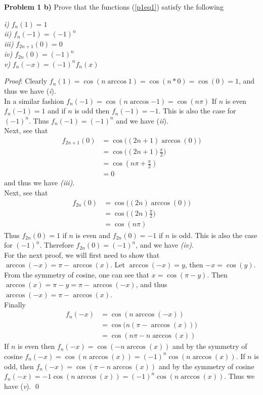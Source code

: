 \documentclass[12pt]{article}
\newcommand{\problem}[1]{\hspace{-4 ex} \large \textbf{Problem #1} }
\renewenvironment{proof}{\hspace{-4 ex} \emph{Proof}:}{\qed}
\begin{document}
\problem{1 b)} Prove that the functions (\ref{p1eq1}) satisfy the following
	
	\emph{i)} $f_n(1) = 1$ \\
	\emph{ii)} $f_n(-1) = (-1)^n$ \\
	\emph{iii)} $f_{2n+1}(0) = 0$ \\
	\emph{iv)} $f_{2n}(0) = (-1)^n$ \\
	\emph{v)} $f_n(-x) = (-1)^nf_n(x)$
	
	\doublespacing
	\begin{proof}
		Clearly $f_n(1) = \cos{(n \arccos{1})} = \cos{(n*0)} = \cos{(0)} = 1$, and thus we have (\emph{i}). \\
		In a similar fashion $f_n(-1) = \cos{(n \arccos{-1})} = \cos(n\pi)$ If $n$ is even $f_n(-1) = 1$ and if $n$ is odd then $f_n(-1)=-1$. This is also the case for $(-1)^n$. Thus $f_n(-1) = (-1)^n$ and we have (\emph{ii}). \\
		Next, see that
		\begin{align*}
			f_{2n+1}(0) & = \cos \big( (2n+1) \arccos(0) \big) \\
			& = \cos \big( (2n+1) \tfrac{\pi}{2} \big) \\
			& = \cos(n\pi + \tfrac{\pi}{2}) \\
			& = 0
		\end{align*}
		and thus we have \emph{(iii)}.\\
		Next, see that
		\begin{align*}
			f_{2n}(0) & = \cos \big( (2n) \arccos(0) \big) \\
			& = \cos \big( (2n) \tfrac{\pi}{2} \big) \\
			& = \cos(n\pi)
		\end{align*}
		Thus $f_{2n}(0)=1$ if $n$ is even and $f_{2n}(0)=-1$ if $n$ is odd. This is also the case for $(-1)^n$. Therefore $f_{2n}(0) = (-1)^n$, and we have \emph{(iv)}.\\
		For the next proof, we will first need to show that $\arccos(-x) = \pi - \arccos(x)$. Let $\arccos(-x)=y$, then $-x = \cos(y)$. From the symmetry of cosine, one can see that $x = \cos(\pi-y)$. Then $\arccos(x) = \pi - y = \pi - \arccos(-x)$, and thus $\arccos(-x) = \pi - \arccos(x)$.\\
		Finally 
		\begin{align*}
			f_n(-x) & = \cos(n \arccos(-x)) \\
			& = \cos \big( n (\pi - \arccos(x)) \big) \\
			& = \cos (n\pi - n\arccos(x))
		\end{align*}
		If $n$ is even then $f_n(-x) = \cos(-n \arccos(x))$ and by the symmetry of cosine $f_n(-x) = \cos(n \arccos(x)) = (-1)^n\cos(n \arccos(x))$. If $n$ is odd, then $f_n(-x) = \cos(\pi -n \arccos(x))$ and by the symmetry of cosine $f_n(-x) = -1\cos(n\arccos(x)) = (-1)^n\cos(n \arccos(x))$. Thus we have (\emph{v}).
	\end{proof}
\end{document}
